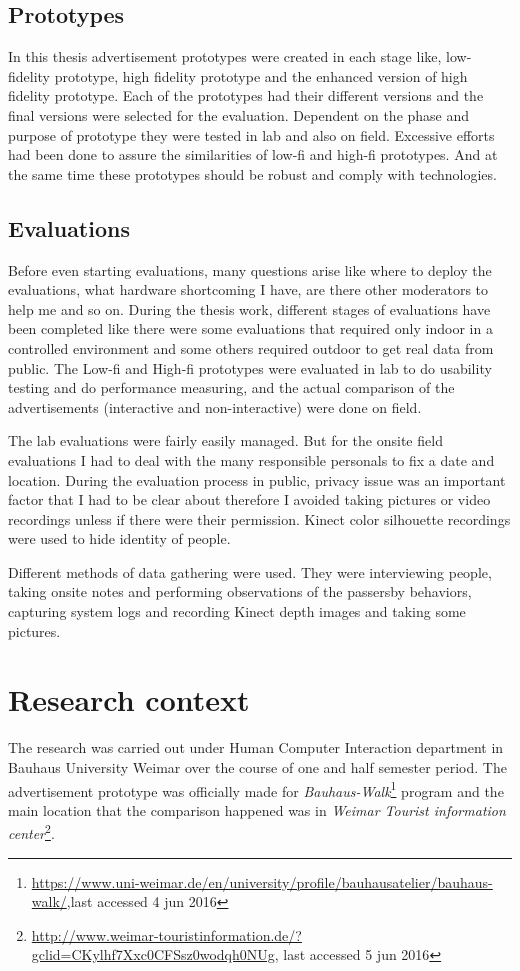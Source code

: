 \subsection{Prototypes}
In this thesis advertisement prototypes were created in each stage like, low-fidelity prototype, high fidelity prototype and the enhanced version of high fidelity prototype. Each of the prototypes had their different versions and the final versions were selected for the evaluation. Dependent on the phase and purpose of prototype they were tested in lab and also on field. Excessive efforts had been done to assure the similarities of low-fi and high-fi prototypes. And at the same time these prototypes should be robust and comply with technologies.  


\subsection{Evaluations}
Before even starting evaluations, many questions arise like where to deploy the evaluations, what hardware shortcoming I have, are there other moderators to help me and so on. During the thesis work, different stages of evaluations have been completed like there were some evaluations that required only indoor in a controlled environment and some others required outdoor to get real data from public. The Low-fi and High-fi prototypes were evaluated in lab to do usability testing and do performance measuring, and the actual comparison of the advertisements (interactive and non-interactive) were done on field. 

The lab evaluations were fairly easily managed. But for the onsite field evaluations I had to deal with the many responsible personals to fix a date and location. During the evaluation process in public, privacy issue was an important factor that I had to be clear about therefore I avoided taking pictures or video recordings unless if there were their permission. Kinect color silhouette recordings were used to hide identity of people.

Different methods of data gathering were used. They were interviewing people, taking onsite notes and performing observations of the passersby behaviors, capturing system logs and recording Kinect depth images and taking some pictures.



\section{Research context}
The research was carried out under Human Computer Interaction department in Bauhaus University Weimar over the course of one and half semester period. The advertisement prototype was officially made for \emph{Bauhaus-Walk}\footnote{\url{ https://www.uni-weimar.de/en/university/profile/bauhausatelier/bauhaus-walk/},last accessed 4 jun 2016} program and the main location that the comparison happened was in \emph{Weimar Tourist information center}\footnote{\url{ http://www.weimar-touristinformation.de/?gclid=CKylhf7Xxc0CFSsz0wodqh0NUg}, last accessed 5 jun 2016}.


